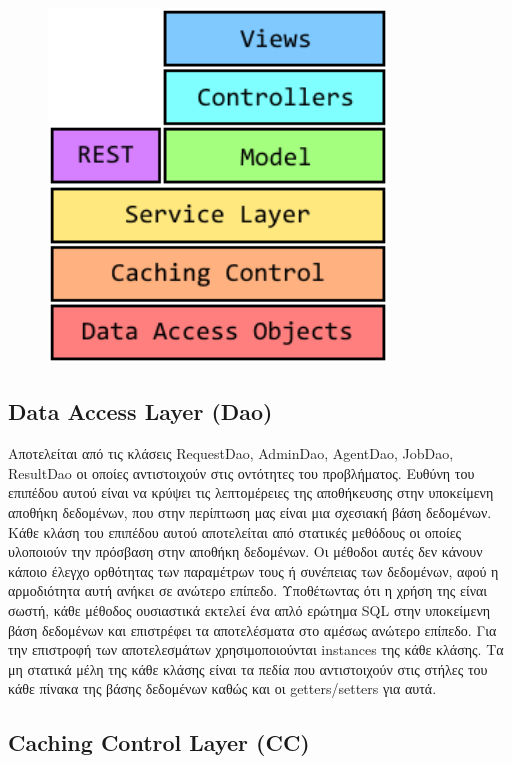 \documentclass[a4paper,11pt]{article}
\begin{document}
\begin{sloppypar}
\begin{figure}[h]
\includegraphics[width=9cm]{layers}
\centering
\end{figure}

\newpage


\subsection{Data Access Layer (Dao)}

Αποτελείται από τις κλάσεις RequestDao, AdminDao, AgentDao, JobDao, ResultDao οι οποίες αντιστοιχούν στις οντότητες του προβλήματος. Ευθύνη του επιπέδου αυτού είναι να κρύψει τις λεπτομέρειες της αποθήκευσης στην υποκείμενη αποθήκη δεδομένων, που στην περίπτωση μας είναι μια σχεσιακή βάση δεδομένων. Κάθε κλάση του επιπέδου αυτού αποτελείται από στατικές μεθόδους οι οποίες υλοποιούν την πρόσβαση στην αποθήκη δεδομένων. Οι μέθοδοι αυτές δεν κάνουν κάποιο έλεγχο ορθότητας των παραμέτρων τους ή συνέπειας των δεδομένων, αφού η αρμοδιότητα αυτή ανήκει σε ανώτερο επίπεδο. Υποθέτωντας ότι η χρήση της είναι σωστή, κάθε μέθοδος ουσιαστικά εκτελεί ένα απλό ερώτημα SQL στην υποκείμενη βάση δεδομένων και επιστρέφει τα αποτελέσματα στο αμέσως ανώτερο επίπεδο. Για την επιστροφή των αποτελεσμάτων χρησιμοποιούνται instances της κάθε κλάσης. Τα μη στατικά μέλη της κάθε κλάσης είναι τα πεδία που αντιστοιχούν στις στήλες του κάθε πίνακα της βάσης δεδομένων καθώς και οι getters/setters για αυτά.

\subsection{Caching Control Layer (CC)}


\end{sloppypar}
\end{document}
